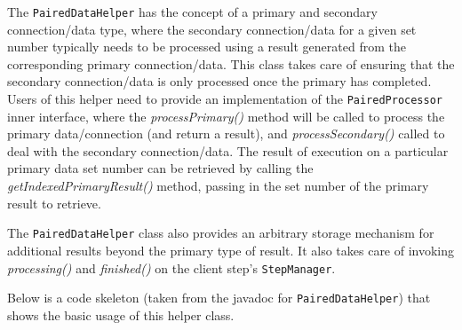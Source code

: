 The \verb=PairedDataHelper= has the concept of a primary and secondary
connection/data type, where the secondary connection/data for a given
set number typically needs to be processed using a result generated
from the corresponding primary connection/data. This class takes care
of ensuring that the secondary connection/data is only processed once
the primary has completed. Users of this helper need to provide an
implementation of the \verb=PairedProcessor= inner interface, where
the \textit{processPrimary()} method will be called to process the
primary data/connection (and return a result), and
\textit{processSecondary()} called to deal with the secondary
connection/data. The result of execution on a particular primary data
set number can be retrieved by calling the
\textit{getIndexedPrimaryResult()} method, passing in the set number
of the primary result to retrieve.

The \verb=PairedDataHelper= class also provides an arbitrary storage
mechanism for additional results beyond the primary type of result. It
also takes care of invoking \textit{processing()} and
\textit{finished()} on the client step's \verb=StepManager=.

Below is a code skeleton (taken from the javadoc for
\verb=PairedDataHelper=) that shows the basic usage of this helper
class.

